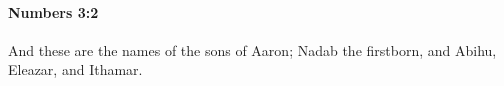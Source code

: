 
		\paragraph{Numbers 3:2} %
			\label{NUMBERS-3-2}

			And these are the names of the sons of Aaron; Nadab the firstborn, and Abihu, Eleazar, and Ithamar.


